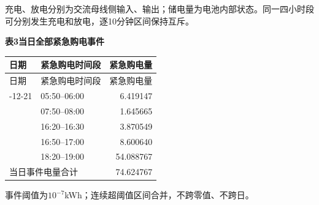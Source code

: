 \noindent 充电、放电分别为交流母线侧输入、输出；储电量为电池内部状态。同一四小时段可分别发生充电和放电，逐10分钟区间保持互斥。
\begin{center}\textbf{表3\quad 当日全部紧急购电事件}\end{center}
\begin{longtable}{llr}\toprule 日期 & 紧急购电时间段 & 紧急购电量\\\midrule\endfirsthead
\toprule 日期 & 紧急购电时间段 & 紧急购电量\\\midrule\endhead
\bottomrule\endfoot
2025-12-21 & 05:50--06:00 & 6.419147\\
 & 07:50--08:00 & 1.645665\\
 & 16:20--16:30 & 3.870549\\
 & 16:50--17:00 & 8.600640\\
 & 18:20--19:00 & 54.088767\\
\midrule\multicolumn{2}{l}{当日事件电量合计} & 74.624767\\
\end{longtable}
\noindent 事件阈值为$10^{-7}$kWh；连续超阈值区间合并，不跨零值、不跨日。
\endgroup
\clearpage

